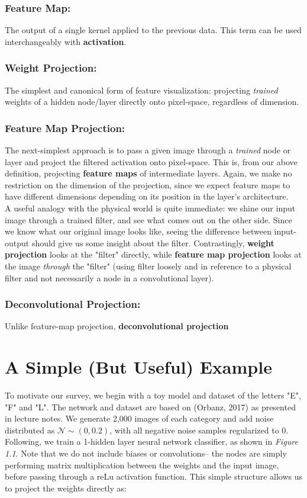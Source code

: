 \documentclass[12pt]{article}
\begin{document}
\subsubsection{Feature Map:}
The output of a single kernel applied to the previous data. This term can be used interchangeably with \textbf{activation}. 

\subsubsection{Weight Projection:}
The simplest and canonical form of feature visualization: projecting \textit{trained} weights of a hidden node/layer directly onto pixel-space, regardless of dimension.

\subsubsection{Feature Map Projection:}
The next-simplest approach is to pass a given image through a \textit{trained} node or layer and project the filtered activation onto pixel-space. This is, from our above definition, projecting \textbf{feature maps} of intermediate layers. Again, we make no restriction on the dimension of the projection, since we expect feature maps to have different dimensions depending on its position in the layer's architecture.\\

A useful analogy with the physical world is quite immediate: we shine our input image through a trained filter, and see what comes out on the other side. Since we know what our original image looks like, seeing the difference between input-output should give us some insight about the filter. Contrastingly, \textbf{weight projection} looks at the "filter" directly, while \textbf{feature map projection} looks at the image \textit{through} the "filter" (using filter loosely and in reference to a physical filter and not necessarily a node in a convolutional layer).

\subsubsection{Deconvolutional Projection:}
Unlike feature-map projection, \textbf{deconvolutional projection} 

\section{A Simple (But Useful) Example}
To motivate our survey, we begin with a toy model and dataset of the letters "E", "F" and "L". The network and dataset are based on (Orbanz, 2017) as presented in lecture notes. We generate 2,000 images of each category and add noise distributed as $\mathcal{N} \sim (0, 0.2)$, with all negative noise samples regularized to 0. Following, we train a 1-hidden layer neural network classifier, as shown in \textit{Figure 1.1}. Note that we do not include biases or convolutions-- the nodes are simply performing matrix multiplication between the weights and the input image, before passing through a reLu activation function. This simple structure allows us to project the weights directly as: \\
\end{document}
